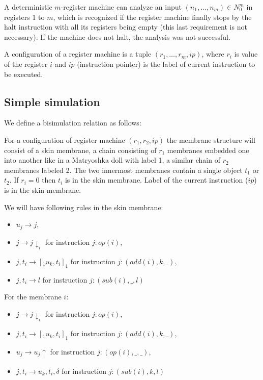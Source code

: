 \documentclass[llncs,submission,copyright,creativecommons]{../lib/lncs/llncs}
\begin{document}
A deterministic $m$-register machine can analyze an input $(n_1,\dots,n_m)\in N_0^m$ in registers 1 to $m$, which is recognized if the register machine finally stops by the halt instruction with all its registers being empty (this last requirement is not necessary). If the machine does not halt, the analysis was not successful.

A configuration of a register machine is a tuple $(r_1, \ldots, r_m, ip)$, where $r_i$ is value of the register $i$ and $ip$ (instruction pointer) is the label of current instruction to be executed.


\subsection{Simple simulation} %
\label{sub:simple_simulation}

We define a bisimulation relation as follows:

For a configuration of register machine $(r_1, r_2, ip)$ the membrane structure will consist of a skin membrane, a chain consisting of $r_1$ membranes embedded one into another like in a Matryoshka doll with label 1, a similar chain of $r_2$ membranes labeled 2. The two innermost membranes contain a single object $t_1$ or $t_2$. If $r_i = 0$ then $t_i$ is in the skin membrane. Label of the current instruction ($ip$) is in the skin membrane.

We will have following rules in the skin membrane:
\begin{itemize}
  \item $u_j \rightarrow j$,
  \item $j \rightarrow j\downarrow_{i}$ for instruction $j: op(i)$,
  \item $j, t_i \rightarrow [_1 u_k, t_i ]_1$ for instruction $j: (add(i), k, \_)$,
  \item $j, t_i \rightarrow l$ for instruction $j: (sub(i), \_, l)$
\end{itemize}

For the membrane $i$:
\begin{itemize}
  \item $j \rightarrow j\downarrow_{i}$ for instruction $j: op(i)$,
  \item $j, t_i \rightarrow [_1 u_k, t_i ]_1$ for instruction $j: (add(i), k, \_)$,
  \item $u_j \rightarrow u_j\uparrow$ for instruction $j: (op(i), \_, \_)$,
  \item $j, t_i \rightarrow u_k, t_i, \delta$ for instruction $j: (sub(i), k, l)$
\end{itemize}
\end{document}

